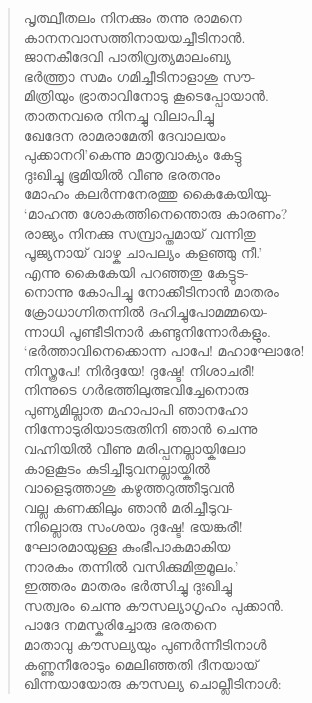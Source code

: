 \begin{verse}
പൃത്ഥ്വീതലം നിനക്കും തന്നു രാമനെ\\
കാനനവാസത്തിനായയച്ചീടിനാന്‍.\\
ജാനകീദേവി പാതിവ്രത്യമാലംബ്യ\\
ഭര്‍ത്ത്രാ സമം ഗമിച്ചീടിനാളാശു സൗ-\\
മിത്രിയും ഭ്രാതാവിനോടു കൂടെപ്പോയാന്‍.\\
താതനവരെ നിനച്ചു വിലാപിച്ചു\\
ഖേദേന രാമരാമേതി ദേവാലയം\\
പുക്കാനറി’കെന്നു മാതൃവാക്യം കേട്ടു\\
ദുഃഖിച്ചു ഭൂമിയില്‍ വീണു ഭരതനും\\
മോഹം കലര്‍ന്നനേരത്തു കൈകേയിയു-\\
‘മാഹന്ത ശോകത്തിനെന്തൊരു കാരണം?\\
രാജ്യം നിനക്കു സമ്പ്രാപ്തമായ് വന്നിതു\\
പൂജ്യനായ് വാഴ്ക ചാപല്യം കളഞ്ഞു നീ.’\\
എന്നു കൈകേയി പറഞ്ഞതു കേട്ടുട-\\
നൊന്നു കോപിച്ചു നോക്കീടിനാന്‍ മാതരം\\
ക്രോധാഗ്നിതന്നില്‍ ദഹിച്ചുപോമമ്മയെ-\\
ന്നാധി പൂണ്ടീടിനാര്‍ കണ്ടുനിന്നോര്‍കളും.\\
‘ഭര്‍ത്താവിനെക്കൊന്ന പാപേ! മഹാഘോരേ!\\
നിസ്ത്രപേ! നിര്‍ദ്ദയേ! ദുഷ്ടേ! നിശാചരീ!\\
നിന്നുടെ ഗര്‍ഭത്തിലുത്ഭവിച്ചേനൊരു\\
പുണ്യമില്ലാത മഹാപാപി ഞാനഹോ\\
നിന്നോടുരിയാടരുതിനി ഞാന്‍ ചെന്നു\\
വഹ്നിയില്‍ വീണു മരിപ്പനല്ലായ്കിലോ\\
കാളകൂടം കുടിച്ചീടുവനല്ലായ്കില്‍\\
വാളെടുത്താശു കഴുത്തറുത്തീടുവന്‍\\
വല്ല കണക്കിലും ഞാന്‍ മരിച്ചീടുവ-\\
നില്ലൊരു സംശയം ദുഷ്ടേ! ഭയങ്കരീ!\\
ഘോരമായുള്ള കുംഭീപാകമാകിയ\\
നാരകം തന്നില്‍ വസിക്കുമിതുമൂലം.’\\
ഇത്തരം മാതരം ഭര്‍ത്സിച്ചു ദുഃഖിച്ചു\\
സത്വരം ചെന്നു കൗസല്യാഗൃഹം പുക്കാന്‍.\\
പാദേ നമസ്കരിച്ചോരു ഭരതനെ\\
മാതാവു കൗസല്യയും പുണര്‍ന്നീടിനാള്‍\\
കണ്ണുനീരോടും മെലിഞ്ഞതി ദീനയായ്\\
ഖിന്നയായോരു കൗസല്യ ചൊല്ലീടിനാള്‍:\\

\end{verse}
